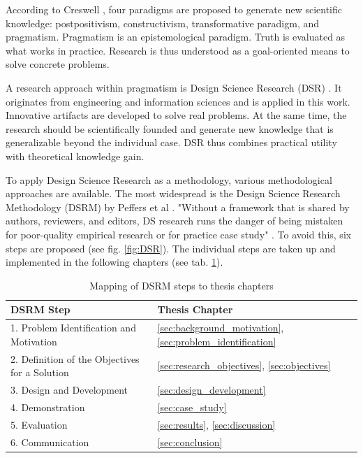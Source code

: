 \begin{English}
    According to Creswell \cite{creswellHttpsWwwucgacmeSkladiste}, four paradigms are proposed to generate new scientific knowledge: postpositivism, constructivism, transformative paradigm, and pragmatism. Pragmatism is an epistemological paradigm. Truth is evaluated as what works in practice. Research is thus understood as a goal-oriented means to solve concrete problems. 
    
    A research approach within pragmatism is Design Science Research (DSR) \cite{desordiDesignScienceResearch2021}. It originates from engineering and information sciences and is applied in this work. Innovative artifacts are developed to solve real problems. At the same time, the research should be scientifically founded and generate new knowledge that is generalizable beyond the individual case. DSR thus combines practical utility with theoretical knowledge gain.
            
    To apply Design Science Research as a methodology, various methodological approaches are available. The most widespread \cite{desordiDesignScienceResearch2021} is the Design Science Research Methodology (DSRM) by Peffers et al \cite{peffersPDFDesignScience2024}. "Without a framework that is shared by authors, reviewers, and editors, DS research runs the danger of being mistaken for poor-quality empirical research or for practice case study" \cite{peffersPDFDesignScience2024}. To avoid this, six steps are proposed (see fig. \ref{fig:DSR}). The individual steps are taken up and implemented in the following chapters (see tab. \ref{tab:DSRM_steps}).
\end{English}

\begin{table}[htbp]
    \centering
    \begin{tabular}{ll}
    \toprule
    \textbf{DSRM Step} & \textbf{Thesis Chapter} \\
    \midrule
    1. Problem Identification and Motivation & \ref{sec:background_motivation}, \ref{sec:problem_identification} \\
    2. Definition of the Objectives for a Solution & \ref{sec:research_objectives}, \ref{sec:objectives} \\
    3. Design and Development & \ref{sec:design_development} \\
    4. Demonstration & \ref{sec:case_study} \\
    5. Evaluation & \ref{sec:results}, \ref{sec:discussion} \\
    6. Communication & \ref{sec:conclusion} \\
    \bottomrule
    \end{tabular}
    \caption{Mapping of DSRM steps to thesis chapters}
    \label{tab:DSRM_steps}
\end{table}

